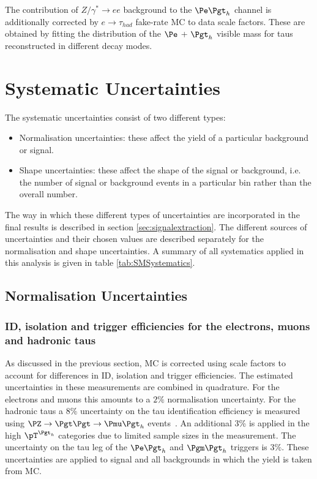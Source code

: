 The contribution of $Z/\gamma^{*} \to ee$ background to the $\etau$ channel
is additionally corrected by $e \to \tau_{had}$ fake-rate \ac{MC} to data
scale factors. These are obtained by fitting the distribution of the $\Pe$ +
$\Pgt_{h}$ visible mass for taus reconstructed in different decay modes. 

\section{Systematic Uncertainties}
\label{sec:systematics}

The systematic uncertainties consist of two different types:

\begin{itemize} 
\item Normalisation uncertainties: these affect the yield of a particular background or
signal.
\item Shape uncertainties: these affect the shape of the signal or background,
i.e. the number of signal or background events in a particular bin rather
than the overall number.
\end{itemize}

The way in which these different types of uncertainties are incorporated in the
final results is described in section \ref{sec:signalextraction}. The different
sources of uncertainties and their chosen values are described separately for the 
normalisation and shape uncertainties. A summary of all systematics applied in
this analysis is given in table \ref{tab:SMSystematics}.

\subsection{Normalisation Uncertainties}
\label{sec:systematicUncertainties_yield}

\subsubsection{\textbf{ID, isolation and trigger efficiencies for the electrons, muons and
hadronic taus}}
As discussed in the previous section, \ac{MC} is corrected using scale factors
to account for differences in ID, isolation and trigger efficiencies. The
estimated uncertainties in these measurements are combined in quadrature. 
For the electrons and muons this amounts to a $2\%$ normalisation uncertainty.
For the hadronic taus a $8\%$ uncertainty on the tau identification efficiency
is measured using $\PZ \to \Pgt\Pgt \to \Pmu\Pgth$
events~\cite{Chatrchyan:2012zz}. An additional 3\% is applied in the high
$\pT^{\Pgth}$ categories due to limited sample sizes in the measurement. 
The uncertainty on the tau leg of the $\etau$ and $\mutau$ triggers is $3\%$.
These uncertainties are applied to signal and all backgrounds in which the yield
is taken from \ac{MC}.


